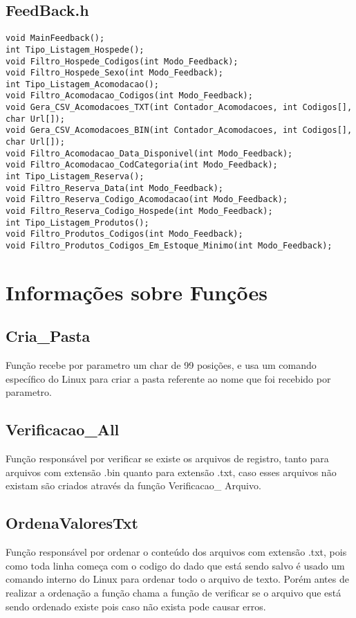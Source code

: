 \documentclass{article}
\begin{document}
\subsection{FeedBack.h}
\begin{lstlisting}
void MainFeedback();
int Tipo_Listagem_Hospede();
void Filtro_Hospede_Codigos(int Modo_Feedback); 
void Filtro_Hospede_Sexo(int Modo_Feedback);  
int Tipo_Listagem_Acomodacao();
void Filtro_Acomodacao_Codigos(int Modo_Feedback);  
void Gera_CSV_Acomodacoes_TXT(int Contador_Acomodacoes, int Codigos[], char Url[]);
void Gera_CSV_Acomodacoes_BIN(int Contador_Acomodacoes, int Codigos[], char Url[]);
void Filtro_Acomodacao_Data_Disponivel(int Modo_Feedback);
void Filtro_Acomodacao_CodCategoria(int Modo_Feedback);
int Tipo_Listagem_Reserva();
void Filtro_Reserva_Data(int Modo_Feedback);
void Filtro_Reserva_Codigo_Acomodacao(int Modo_Feedback);
void Filtro_Reserva_Codigo_Hospede(int Modo_Feedback);
int Tipo_Listagem_Produtos();
void Filtro_Produtos_Codigos(int Modo_Feedback);
void Filtro_Produtos_Codigos_Em_Estoque_Minimo(int Modo_Feedback);
\end{lstlisting}
\section{Informações sobre  Funções}
 \subsection{Cria\_Pasta}
	Função recebe por parametro um char de 99 posições, e usa um comando específico do Linux para criar a pasta referente ao nome que foi recebido por parametro.
\subsection{Verificacao\_All}
	Função responsável por verificar se existe os arquivos de registro, tanto para arquivos com extensão .bin quanto para extensão .txt, caso esses arquivos não existam são criados através da função Verificacao\_ Arquivo.
\subsection{OrdenaValoresTxt}
	Função responsável por ordenar o conteúdo dos arquivos com extensão .txt, pois como toda linha começa com o codigo do dado que está sendo salvo é usado um comando interno do Linux para ordenar todo o arquivo de texto. Porém antes de realizar a ordenação a função chama a função de verificar se o arquivo que está sendo ordenado existe pois caso não exista pode causar erros.
\end{document}
